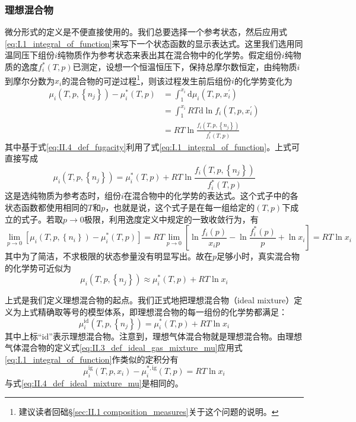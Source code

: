 \documentclass[main.tex]{subfiles}
\begin{document}
\subsubsection{理想混合物}
微分形式的定义是不便直接使用的。我们总要选择一个参考状态，然后应用式\eqref{eq:I.1_integral_of_function}来写下一个状态函数的显示表达式。这里我们选用同温同压下组份$i$纯物质作为参考状态来表出其在混合物中的化学势。假定组份$i$纯物质的逸度$f_i^*\left(T,p\right)$已测定，设想一个恒温恒压下，保持总摩尔数恒定，由纯物质$i$到摩尔分数为$x_i$的混合物的可逆过程\footnote{建议读者回础\S\ref{sec:II.1 composition_measures}关于这个问题的说明。}，则该过程发生前后组份$i$的化学势变化为
\begin{align*}
    \mu_i\left(T,p,\left\{n_j\right\}\right)-\mu_i^*\left(T,p\right) & =\int_1^{x_i}\mathrm{d}\mu_i\left(T,p,x_i^\prime\right)                    \\
                                                                     & =\int_1^{x_i}RT\mathrm{d}\ln f_i\left(T,p,x_i^\prime\right)                \\
                                                                     & =RT\ln\frac{f_i\left(T,p,\left\{n_j\right\}\right)}{f_i^*\left(T,p\right)}
\end{align*}
其中基于式\eqref{eq:II.4_def_fugacity}利用了式\eqref{eq:I.1_integral_of_function}。上式可直接写成
\[
    \mu_i\left(T,p,\left\{n_j\right\}\right)=\mu_i^*\left(T,p\right)+RT\ln\frac{f_i\left(T,p,\left\{n_j\right\}\right)}{f_i^*\left(T,p\right)}
\]
这是选纯物质为参考态时，组份$i$在混合物中的化学势的表达式。这个式子中的各状态函数都使用相同的$T$和$p$，也就是说，这个式子是在每一组给定的$\left(T,p\right)$下成立的式子。若取$p\rightarrow 0$极限，利用逸度定义中规定的一致收敛行为，有
\[\lim_{p\to 0}\left[\mu_i\left(T,p,\left\{n_i\right\}\right)-\mu_i^*\left(T,p\right)\right]=RT\lim_{p\to 0}\left[\ln\frac{f_i\left(p\right)}{x_ip}-\ln\frac{f_i^*\left(p\right)}{p}+\ln x_i\right]=RT\ln x_i\]
其中为了简洁，不求极限的状态参量没有明显写出。故在$p$足够小时，真实混合物的化学势可近似为
\[\mu_i\left(T,p,\left\{n_j\right\}\right)\approx\mu_i^*\left(T,p\right)+RT\ln x_i\]

上式是我们定义理想混合物的起点。我们正式地把理想混合物（ideal mixture）定义为上式精确取等号的模型体系，即理想混合物的每一组份的化学势都满足：
\begin{equation}\label{II.4_def_ideal_mixture_mu}
    \mu_i^\text{id}\left(T,p,\left\{n_j\right\}\right)=\mu_i^*\left(T,p\right)+RT\ln x_i
\end{equation}
其中上标“id”表示理想混合物。注意到，理想气体混合物就是理想混合物。由理想气体混合物的定义式\eqref{eq:II.3_def_ideal_gas_mixture_mu}应用式\eqref{eq:I.1_integral_of_function}作类似的定积分有
\[\mu_i^\text{ig}\left(T,p,x_i\right)-\mu_i^{*,\text{ig}}\left(T,p\right)=RT\ln x_i\]
与式\eqref{eq:II.4_def_ideal_mixture_mu}是相同的。
\end{document}

